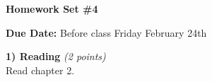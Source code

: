 

\def\xyprime{\ensuremath{\begin{pmatrix} x' \\ y' \end{pmatrix}}}



\thispagestyle{fancy}






\begin{center}
{\huge \textbf{Homework Set \#4}}
\large

{\textbf{ Due Date:} Before class Friday February 24th  }
\end{center}

\textbf{1) Reading } \hfill \textit{(2 points)}\\
Read chapter 2.

\vspace*{0.25in}


